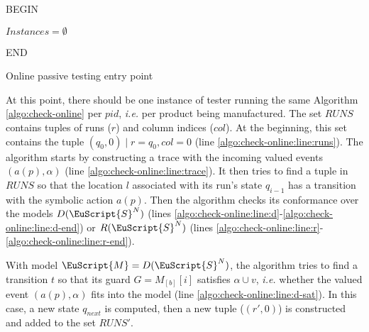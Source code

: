 \begin{algorithm}[h]
    BEGIN\;

    $Instances = \emptyset$\;


    END\;

    \caption{Online passive testing entry point}
    \label{algo:online-entry-point}
\end{algorithm}

At this point, there should be one instance of tester running the
same Algorithm \ref{algo:check-online} per $pid$, \emph{i.e.} per
product being manufactured. The set $RUNS$ contains tuples of
runs ($r$) and column indices ($col$). At the beginning, this set
contains the tuple $(q_0, 0) \mid r = q_0, col = 0$ (line
\ref{algo:check-online:line:runs}). The algorithm starts by
constructing a trace with the incoming valued events $(a(p),
\alpha)$ (line \ref{algo:check-online:line:trace}). It then tries
to find a tuple in $RUNS$ so that the location $l$ associated
with its run's state $q_{i-1}$ has a transition with the symbolic
action $a(p)$. Then the algorithm checks its conformance over the
models $D(\EuScript{S}^{N})$ (lines
\ref{algo:check-online:line:d}-\ref{algo:check-online:line:d-end})
or $R(\EuScript{S}^{N})$ (lines
\ref{algo:check-online:line:r}-\ref{algo:check-online:line:r-end}).

With model $\EuScript{M} = D(\EuScript{S}^{N})$, the algorithm
tries to find a transition $t$ so that its guard $G = M_{[b]}[i]$
satisfies $\alpha \cup v$, \emph{i.e.} whether the valued event
$(a(p), \alpha)$ fits into the model (line
\ref{algo:check-online:line:d-sat}). In this case, a new state
$q_{next}$ is computed, then a new tuple ($(r', 0)$) is
constructed and added to the set $RUNS'$.

